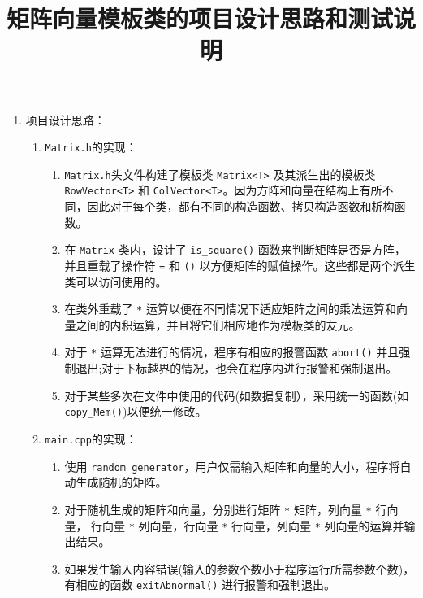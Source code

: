 \documentclass[a4paper,12pt]{article}
\begin{document}
\title{\hei 矩阵向量模板类的项目设计思路和测试说明}


\maketitle


\begin{enumerate}
\item 项目设计思路：
\begin{enumerate}
    \item \verb|Matrix.h|的实现：
    \begin{enumerate}
        \item \verb|Matrix.h|头文件构建了模板类 \verb|Matrix<T>| 及其派生出的模板类 \verb|RowVector<T>| 和 \verb|ColVector<T>|。因为方阵和向量在结构上有所不同，因此对于每个类，都有不同的构造函数、拷贝构造函数和析构函数。
        \item 在 \verb|Matrix| 类内，设计了 \verb|is_square()| 函数来判断矩阵是否是方阵，并且重载了操作符 \verb|=| 和 \verb|()| 以方便矩阵的赋值操作。这些都是两个派生类可以访问使用的。
        \item 在类外重载了 \verb|*| 运算以便在不同情况下适应矩阵之间的乘法运算和向量之间的内积运算，并且将它们相应地作为模板类的友元。
        \item 对于 \verb|*| 运算无法进行的情况，程序有相应的报警函数 \verb|abort()| 并且强制退出;对于下标越界的情况，也会在程序内进行报警和强制退出。
        \item 对于某些多次在文件中使用的代码(如数据复制），采用统一的函数(如 \verb|copy_Mem()|)以便统一修改。
    \end{enumerate}
    \item \verb|main.cpp|的实现：
    \begin{enumerate}
        \item  使用 \verb|random generator|，用户仅需输入矩阵和向量的大小，程序将自动生成随机的矩阵。
        \item 对于随机生成的矩阵和向量，分别进行矩阵 \verb|*| 矩阵，列向量 \verb|*| 行向量， 行向量 \verb|*| 列向量，行向量 \verb|*| 行向量，列向量 \verb|*| 列向量的运算并输出结果。
        \item 如果发生输入内容错误(输入的参数个数小于程序运行所需参数个数)，有相应的函数 \verb|exitAbnormal()| 进行报警和强制退出。

\end{enumerate}
\end{enumerate}
\end{enumerate}
\end{document}
